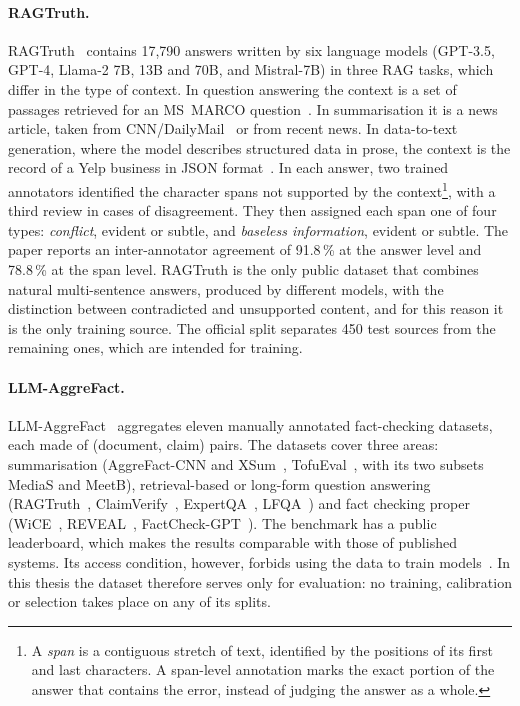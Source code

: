 \paragraph{RAGTruth.} RAGTruth~\cite{niu2024ragtruth} contains 17{,}790 answers written by six language models
(GPT-3.5, GPT-4, Llama-2 7B, 13B and 70B, and Mistral-7B) in three RAG tasks, which differ in the type of context. In
question answering the context is a set of passages retrieved for an MS~MARCO question~\cite{nguyen2016msmarco}. In
summarisation it is a news article, taken from CNN/DailyMail~\cite{hermann2015teaching,see2017pointer} or from recent
news. In data-to-text generation, where the model describes structured data in prose, the context is the record of a
Yelp business in JSON format~\cite{yelpdataset}. In each answer, two trained annotators identified the character spans
not supported by the context\footnote{A \emph{span} is a contiguous stretch of text, identified by the positions of its
first and last characters. A span-level annotation marks the exact portion of the answer that contains the error,
instead of judging the answer as a whole.}, with a third review in cases of disagreement. They then assigned each span
one of four types: \emph{conflict}, evident or subtle, and \emph{baseless information}, evident or subtle. The paper
reports an inter-annotator agreement of 91.8\,\% at the answer level and 78.8\,\% at the span level. RAGTruth is the
only public dataset that combines natural multi-sentence answers, produced by different models, with the distinction
between contradicted and unsupported content, and for this reason it is the only training source. The official split
separates 450 test sources from the remaining ones, which are intended for training.

\paragraph{LLM-AggreFact.} LLM-AggreFact~\cite{tang2024minicheck,llmaggrefact} aggregates eleven manually annotated
fact-checking datasets, each made of (document, claim) pairs. The datasets cover three areas: summarisation
(AggreFact-CNN and XSum~\cite{tang2023aggrefact}, TofuEval~\cite{tang2024tofueval}, with its two subsets MediaS and
MeetB), retrieval-based or long-form question answering (RAGTruth~\cite{niu2024ragtruth},
ClaimVerify~\cite{liu2023verifiability}, ExpertQA~\cite{malaviya2024expertqa}, LFQA~\cite{chen2024lfqa}) and fact
checking proper (WiCE~\cite{kamoi2023wice}, REVEAL~\cite{jacovi2024reveal},
FactCheck-GPT~\cite{wang2024factcheckbench}). The benchmark has a public leaderboard, which makes the results comparable
with those of published systems. Its access condition, however, forbids using the data to train models~\cite{hf_llmaggrefact}.
In this thesis the dataset therefore serves only for evaluation: no training, calibration or selection takes place on
any of its splits.

